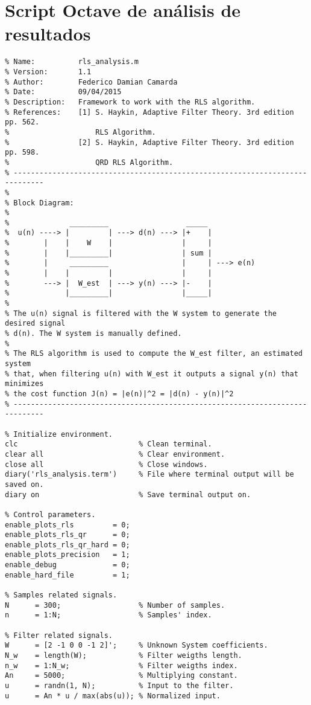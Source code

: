 \chapter{Script Octave de análisis de resultados}
\label{cap:apB}

\begin{lstlisting}[style=C]
% -----------------------------------------------------------------------------
% Name:          rls_analysis.m
% Version:       1.1
% Author:        Federico Damian Camarda
% Date:          09/04/2015
% Description:   Framework to work with the RLS algorithm.
% References:    [1] S. Haykin, Adaptive Filter Theory. 3rd edition pp. 562.
%                    RLS Algorithm.
%                [2] S. Haykin, Adaptive Filter Theory. 3rd edition pp. 598.
%                    QRD RLS Algorithm.
% -----------------------------------------------------------------------------
%
% Block Diagram:
%
%              _________                  _____
%  u(n) ----> |         | ---> d(n) ---> |+    |
%        |    |    W    |                |     |
%        |    |_________|                | sum |
%        |     _________                 |     | ---> e(n)
%        |    |         |                |     |
%        ---> |  W_est  | ---> y(n) ---> |-    |
%             |_________|                |_____|
%
% The u(n) signal is filtered with the W system to generate the desired signal
% d(n). The W system is manually defined.
%
% The RLS algorithm is used to compute the W_est filter, an estimated system
% that, when filtering u(n) with W_est it outputs a signal y(n) that minimizes
% the cost function J(n) = |e(n)|^2 = |d(n) - y(n)|^2
% -----------------------------------------------------------------------------

% Initialize environment.
clc                            % Clean terminal.
clear all                      % Clear environment.
close all                      % Close windows.
diary('rls_analysis.term')     % File where terminal output will be saved on.
diary on                       % Save terminal output on.

% Control parameters.
enable_plots_rls         = 0;
enable_plots_rls_qr      = 0;
enable_plots_rls_qr_hard = 0;
enable_plots_precision   = 1;
enable_debug             = 0;
enable_hard_file         = 1;

% Samples related signals.
N      = 300;                  % Number of samples.
n      = 1:N;                  % Samples' index.

% Filter related signals.
W      = [2 -1 0 0 -1 2]';     % Unknown System coefficients.
N_w    = length(W);            % Filter weigths length.
n_w    = 1:N_w;                % Filter weigths index.
An     = 5000;                 % Multiplying constant.
u      = randn(1, N);          % Input to the filter.
u      = An * u / max(abs(u)); % Normalized input.


\end{lstlisting}
